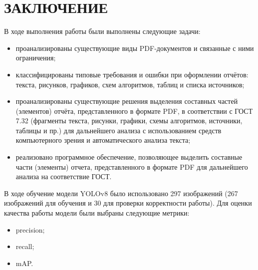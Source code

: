 \chapter*{ЗАКЛЮЧЕНИЕ}

В ходе выполнения работы были выполнены следующие задачи:
\begin{itemize}
	\item проанализированы существующие виды PDF-документов и связанные с ними ограничения;
	\item классифицированы типовые требования и ошибки при оформлении отчётов: текста, рисунков, графиков, схем алгоритмов, таблиц и списка источников;
	\item проанализированы существующие решения выделения составных частей (элементов) отчёта, представленного в формате PDF, в соответствии с ГОСТ 7.32 (фрагменты текста, рисунки, графики, схемы алгоритмов, источники, таблицы и пр.) для дальнейшего анализа с использованием средств компьютерного зрения и автоматического анализа текста;
	\item реализовано программное обеспечение, позволяющее выделить составные части (элементы) отчета, представленного в формате PDF для дальнейшего анализа на соответствие ГОСТ. 
\end{itemize}

В ходе обучение модели YOLOv8 было использовано 297 изображений (267 изображений для обучения и 30 для проверки корректности работы). Для оценки качества работы модели были выбраны следующие метрики:
\begin{itemize}
\item precision;
\item recall;
\item mAP.
\end{itemize}



